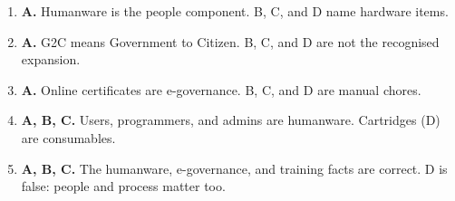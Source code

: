 \documentclass[11pt]{article}
\begin{document}
\begin{enumerate}[label=\textbf{Q\arabic*.}, leftmargin=*]
\item \textbf{A.} Humanware is the people component. B, C, and D name hardware items.
\item \textbf{A.} G2C means Government to Citizen. B, C, and D are not the recognised expansion.
\item \textbf{A.} Online certificates are e-governance. B, C, and D are manual chores.
\item \textbf{A, B, C.} Users, programmers, and admins are humanware. Cartridges (D) are consumables.
\item \textbf{A, B, C.} The humanware, e-governance, and training facts are correct. D is false: people and process matter too.
\end{enumerate}
\def\JKSSBLessonID{47}\def\JKSSBAnswers{1}
\end{document}
